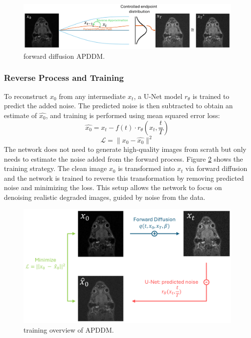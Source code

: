 \documentclass[twocolumn]{article}
\begin{document}
\begin{figure}[H]
    \centering
    \includegraphics[width=1\linewidth]{forward APDDM.png}
    \caption{forward diffusion APDDM.}
    \label{fig:forward APDDM}
\end{figure}


\subsubsection{Reverse Process and Training}
To reconstruct $x_0$ from any intermediate $x_t$, a U-Net model $r_{\theta}$ is trained to predict the added noise. 
The predicted noise is then subtracted to obtain an estimate of $\hat{x_0}$, and training is performed using mean squared error loss: 
\begin{equation}\label{eq:Markov chain}
    \hat{x_0}=x_t-f(t) \cdot r_{\theta}(x_t,\frac{t}{T})
\end{equation}
\begin{equation}
    \mathcal{L}=\|x_0-\hat{x_0}\|^2
\end{equation}
The network does not need to generate high-quality images from scrath but only needs to estimate the noise added from the forward process. 
Figure \ref{fig:APDDM} shows the training strategy. The clean image $x_0$ is transformed into $x_t$ via forward diffusion and the network is trained to reverse this transformation by removing predicted noise and minimizing the loss. 
This setup allows the network to focus on denoising realistic degraded images, guided by noise from the data.

\begin{figure}[H]
    \centering
    \includegraphics[width=1\linewidth]{full APDDM .png}
    \caption{training overview of APDDM.}
    \label{fig:APDDM}
\end{figure}
\end{document}
